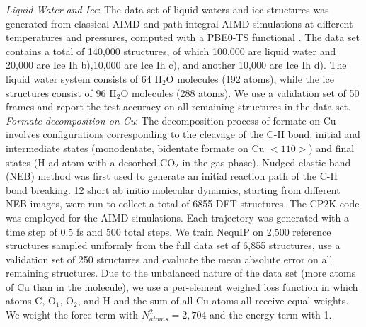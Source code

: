 \documentclass[11pt]{article}
\begin{document}
\textit{Liquid Water and Ice}: The data set of liquid waters and ice structures \cite{deepmd, deepmd_water_paper} was generated from classical AIMD and path-integral AIMD simulations at different temperatures and pressures, computed with a PBE0-TS functional \cite{deepmd}. The data set contains a total of 140,000 structures, of which 100,000 are liquid water and 20,000 are Ice Ih b),10,000 are Ice Ih c), and another 10,000 are Ice Ih d). The liquid water system consists of 64 $\operatorname{H_2O}$ molecules (192 atoms), while the ice structures consist of 96 $\operatorname{H_2O}$ molecules (288 atoms). We use a validation set of 50 frames and report the test accuracy on all remaining structures in the data set. \\

\textit{Formate decomposition on Cu}: The decomposition process of formate on Cu involves configurations corresponding to the cleavage of the C-H bond, initial and intermediate states (monodentate, bidentate formate on Cu $<110>$) and final states (H ad-atom with a desorbed CO$_2$ in the gas phase). Nudged elastic band (NEB) method was first used to generate an initial reaction path of the C-H bond breaking. 12 short ab initio molecular dynamics, starting from different NEB images, were run to collect a total of 6855 DFT structures. The CP2K \cite{Hutter_Iannuzzi_Schiffmann_VandeVondele_2014} code was employed for the AIMD simulations. Each trajectory was generated with a time step of 0.5 fs and 500 total steps. We train NequIP on 2,500 reference structures sampled uniformly from the full data set of 6,855 structures, use a validation set of 250 structures and evaluate the mean absolute error on all remaining structures. Due to the unbalanced nature of the data set (more atoms of Cu than in the molecule), we use a per-element weighed loss function in which atoms C, $\operatorname{O_1}$, $\operatorname{O_2}$, and H and the sum of all Cu atoms all receive equal weights. We weight the force term with $N_{atoms}^2 = 2,704$ and the energy term with 1. \\
\end{document}
